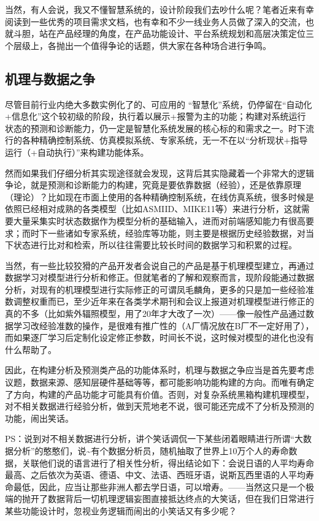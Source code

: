 \documentclass[]{book}
\begin{document}
当然，有人会说，我又不懂智慧系统的，设计阶段我们去吵什么呢？笔者近来有幸阅读到一些优秀的项目需求文档，也有幸和不少一线业务人员做了深入的交流，也就斗胆，站在产品经理的角度，在产品功能设计、平台系统规划和高层决策定位三个层级上，各抛出一个值得争论的话题，供大家在各种场合进行争鸣。

\hypertarget{ux673aux7406ux4e0eux6570ux636eux4e4bux4e89}{%
\subsection{机理与数据之争}\label{ux673aux7406ux4e0eux6570ux636eux4e4bux4e89}}

尽管目前行业内绝大多数实例化了的、可应用的 ``智慧化''系统，仍停留在``自动化+信息化''这个较初级的阶段，执行着以展示+报警为主的功能；构建对系统运行状态的预测和诊断能力，仍一定是智慧化系统发展的核心标的和需求之一。时下流行的各种精确控制系统、仿真模拟系统、专家系统，无一不在以``分析现状+指导运行（+自动执行）''来构建功能体系。

然而如果我们仔细分析其实现途径就会发现，这背后其实隐藏着一个非常大的逻辑争论，就是预测和诊断能力的构建，究竟是要依靠数据（经验），还是依靠原理（理论）？比如现在市面上使用的各种精确控制系统，在线仿真系统，很多时候是依照已经相对成熟的各类模型（比如ASMIID、MIKE11等）来进行分析，这就需要大量采集实时状态数据作为模型分析的基础输入，进而对前端感知能力有很高要求；而时下一些诸如专家系统，经验库等功能，则主要是根据历史经验数据，对当下状态进行比对和检索，所以往往需要比较长时间的数据学习和积累的过程。

当然，有一些比较狡猾的产品开发者会说自己的产品是基于机理模型建立，再通过数据学习对模型进行分析和修正。但就笔者的了解和观察而言，现阶段能通过数据分析，对现有的机理模型进行实际修正的可谓凤毛麟角，更多的只是加一些经验准数调整权重而已，至少近年来在各类学术期刊和会议上报道对机理模型进行修正的真的不多（比如紫外辐照模型，用了20年才大改了一次）------像一般性产品通过数据学习改经验准数的操作，是很难有推广性的（A厂情况放在B厂不一定好用了），而如果逐厂学习后定制化设定修正参数，时间长不说，这时候对模型的进化也没有什么帮助了。

因此，在构建分析及预测类产品的功能体系时，机理与数据之争应当是首先要考虑议题，数据来源、感知层硬件基础等等，都可能影响功能构建的方向。而唯有确定了方向，构建的产品功能才可能具有价值。否则，对复杂系统黑箱构建机理模型，对不相关数据进行经验分析，做到天荒地老不说，很可能还完成不了分析及预测的功能，闹出笑话。

PS：说到对不相关数据进行分析，讲个笑话调侃一下某些闭着眼睛进行所谓``大数据分析''的憨憨们，说\textasciitilde{}有个数据分析员，随机抽取了世界上10万个人的寿命数据，关联他们说的语言进行了相关性分析，得出结论如下：会说日语的人平均寿命最高、之后依次为英语、德语、中文、法语、西班牙语，说斯瓦西里语的人平均寿命最低，因此，应当让那些非洲人都去学日语，可以增寿。------当然这只是一个极端的抛开了数据背后一切机理逻辑妄图直接抵达终点的大笑话，但在我们日常进行某些功能设计时，忽视业务逻辑而闹出的小笑话又有多少呢？
\end{document}
